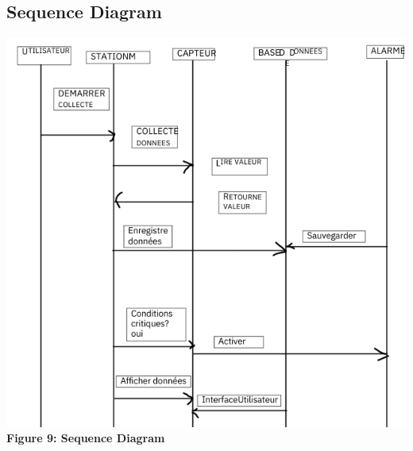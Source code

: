 \documentclass[a4paper,12pt]{article}
\begin{document}
	\subsection{Sequence Diagram}
	\begin{center}
		\includegraphics[width=\textwidth]{diagdesueq.png}\\
		\textbf{Figure 9: Sequence Diagram}
	\end{center}
	
\end{document}
